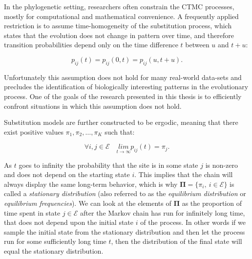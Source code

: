 In the phylogenetic setting, researchers often constrain the CTMC processes, mostly for computational and mathematical convenience.
A frequently applied restriction is to assume time-homogeneity of the substitution process, which states that the evolution does not change in pattern over time, and therefore transition probabilities depend only on the time difference $t$ between $u$ and $t + u$:

\begin{equation}
p_{ij}\left(t\right) = p_{ij}\left(0,t\right) = p_{ij}\left(u,t+u\right).
\label{eq:time_homogeneity}
\end{equation}

Unfortunately this assumption does not hold for many real-world data-sets and precludes the identification of biologically interesting patterns in the evolutionary process. %
One of the goals of the research presented in this thesis is to efficiently confront situations in which this assumption does not hold.

Substitution models are further constructed to be ergodic, meaning that there exist positive values $\pi_{1},\pi_{2},\ldots,\pi_{K}$ such that:

\begin{equation}
\forall i,j\in \mathcal{E}  \quad\underset{t\rightarrow\infty}{lim}p_{ij}(t)=\pi_{j}.
\label{eq:ergodicity}
\end{equation}


As $t$ goes to infinity the probability that the site is in some state $j$ is non-zero and does not depend on the starting state $i$.
This implies that the chain will always display the same long-term behavior, which is why $\mathbf{\Pi}=\{\pi_{i},\ i\in\mathcal{E}\}$ is called a \emph{stationary distribution} (also referred to as the \emph{equilibrium distribution} or \emph{equilibrium frequencies}).
We can look at the elements of $\mathbf{\Pi}$ as the proportion of time spent in state $j\in\mathcal{E}$ after the Markov chain has run for infinitely long time, that does not depend upon the initial state $i$ of the process.
In other words if we sample the initial state from the stationary distribution and then let the process run for some sufficiently long time $t$, then the distribution of the final state will equal the stationary distribution. 

